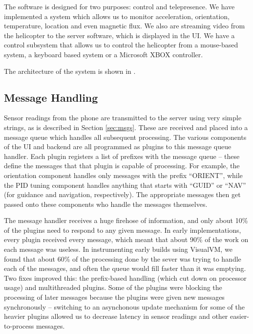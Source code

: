\begin{landscape}
\end{landscape}

The software is designed for two purposes: control and
telepresence. We have implemented a system which allows us to monitor
acceleration, orientation, temperature, location and even magnetic
flux. We also are streaming video from the helicopter to the server
software, which is displayed in the UI. We have a control subsystem
that allows us to control the helicopter from a mouse-based system, a
keyboard based system or a Microsoft XBOX controller. 

The architecture of the system is shown in .

\subsection{Message Handling}
Sensor readings from the phone are transmitted to the server using
very simple strings, as is described in Section \ref{sec:msgs}. These
are received and placed into a message queue which handles all
subsequent processing. The various components of the UI and backend
are all programmed as plugins to this message queue handler. Each
plugin registers a list of prefixes with the message queue -- these
define the messages that that plugin is capable of processing. For
example, the orientation component handles only messages with the
prefix ``ORIENT'', while the PID tuning component handles anything
that starts with ``GUID'' or ``NAV'' (for guidance and navigation,
respectively). The appropriate messages then get passed onto these
components who handle the messages themselves.

The message handler receives a huge firehose of information, and only
about 10\% of the plugins need to respond to any given message. In
early implementations, every plugin received every message, which
meant that about 90\% of the work on each message was useless. In
instrumenting early builds using VisualVM, we found that about 60\% of
the processing done by the sever was trying to handle each of the
messages, and often the queue would fill faster than it was
emptying. Two fixes improved this: the prefix-based handling (which
cut down on processor usage) and multithreaded plugins. Some of the
plugins were blocking the processing of later messages because the
plugins were given new messages synchronously -- switching to an
asynchonous update mechanism for some of the heavier plugins allowed
us to decrease latency in sensor readings and other easier-to-process
messages.


